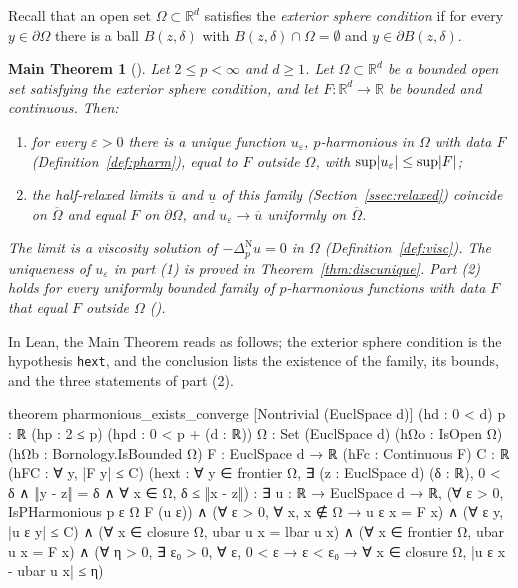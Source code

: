 \documentclass[11pt,reqno]{amsart}
\newcommand{\R}{\mathbb{R}}
\newcommand{\eps}{\varepsilon}
\newcommand{\pnlap}{\Delta_p^{\mathrm{N}}}       %
\DeclarePairedDelimiter{\abs}{\lvert}{\rvert}
\theoremstyle{plain}
\newtheorem*{maintheorem}{Main Theorem}
\theoremstyle{definition}
\theoremstyle{remark}
\begin{document}
Recall that an open set $\Omega \subset \R^d$ satisfies the \emph{exterior
sphere condition} if for every $y \in \partial\Omega$ there is a ball
$B(z,\delta)$ with $B(z,\delta) \cap \Omega = \emptyset$ and
$y \in \partial B(z,\delta)$.

\begin{maintheorem}[]
Let $2 \le p < \infty$ and $d \ge 1$. Let $\Omega \subset \R^d$ be a bounded
open set satisfying the exterior sphere condition, and let
$F \colon \R^d \to \R$ be bounded and continuous. Then:
\begin{enumerate}
  \item for every $\eps > 0$ there is a unique function $u_\eps$, $p$-harmonious in
    $\Omega$ with data $F$ (Definition~\ref{def:pharm}), equal to $F$ outside
    $\Omega$, with
    $\sup\abs{u_\eps} \le \sup\abs F$;
  \item the half-relaxed limits $\overline u$ and $\underline u$ of this
    family (Section~\ref{ssec:relaxed}) coincide on $\overline\Omega$ and equal $F$ on $\partial\Omega$, and
    $u_\eps \to \overline u$ uniformly on $\overline\Omega$.
\end{enumerate}
The limit is a viscosity solution of $-\pnlap u = 0$ in $\Omega$
(Definition~\ref{def:visc}). The uniqueness of $u_\eps$ in part (1) is proved
in Theorem~\ref{thm:discunique}. Part (2)
holds for every uniformly bounded family of $p$-harmonious functions with data
$F$ that equal $F$ outside $\Omega$ ().
\end{maintheorem}

\noindent In Lean, the Main Theorem reads as follows; the exterior sphere
condition is the hypothesis \texttt{hext}, and the conclusion lists the
existence of the family, its bounds, and the three statements of part (2).
\begin{lean}
theorem pharmonious_exists_converge [Nontrivial (EuclSpace d)] (hd : 0 < d)
    {p : ℝ} (hp : 2 ≤ p) (hpd : 0 < p + (d : ℝ)) {Ω : Set (EuclSpace d)}
    (hΩo : IsOpen Ω) (hΩb : Bornology.IsBounded Ω) {F : EuclSpace d → ℝ}
    (hFc : Continuous F) {C : ℝ} (hFC : ∀ y, |F y| ≤ C)
    (hext : ∀ y ∈ frontier Ω, ∃ (z : EuclSpace d) (δ : ℝ), 0 < δ ∧
      ‖y - z‖ = δ ∧ ∀ x ∈ Ω, δ ≤ ‖x - z‖) :
    ∃ u : ℝ → EuclSpace d → ℝ,
      (∀ ε > 0, IsPHarmonious p ε Ω F (u ε)) ∧
      (∀ ε > 0, ∀ x, x ∉ Ω → u ε x = F x) ∧
      (∀ ε y, |u ε y| ≤ C) ∧
      (∀ x ∈ closure Ω, ubar u x = lbar u x) ∧
      (∀ x ∈ frontier Ω, ubar u x = F x) ∧
      (∀ η > 0, ∃ ε₀ > 0, ∀ ε, 0 < ε → ε < ε₀ → ∀ x ∈ closure Ω,
        |u ε x - ubar u x| ≤ η)
\end{lean}
\end{document}
